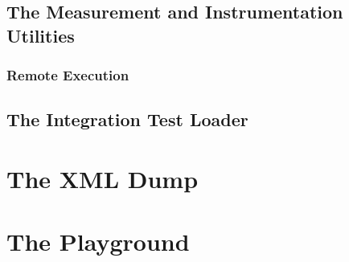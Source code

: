\subsection{The Measurement and Instrumentation Utilities}
\label{sec:Driver.MeasureAndInstrument}
\subsubsection{Remote Execution}
\subsection{The Integration Test Loader}

\section{The XML Dump}
\section{The Playground}
